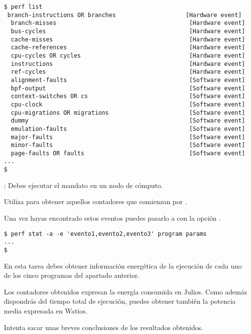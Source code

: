 \begin{lstlisting}[style=terminal]
$ perf list
 branch-instructions OR branches                    [Hardware event]
  branch-misses                                      [Hardware event]
  bus-cycles                                         [Hardware event]
  cache-misses                                       [Hardware event]
  cache-references                                   [Hardware event]
  cpu-cycles OR cycles                               [Hardware event]
  instructions                                       [Hardware event]
  ref-cycles                                         [Hardware event]
  alignment-faults                                   [Software event]
  bpf-output                                         [Software event]
  context-switches OR cs                             [Software event]
  cpu-clock                                          [Software event]
  cpu-migrations OR migrations                       [Software event]
  dummy                                              [Software event]
  emulation-faults                                   [Software event]
  major-faults                                       [Software event]
  minor-faults                                       [Software event]
  page-faults OR faults                              [Software event]
...
$
\end{lstlisting}

: Debes ejecutar el mandato en un nodo de cómputo.

Utiliza  para obtener aquellos contadores que comienzan 
por .

Una vez hayas encontrado estos eventos puedes pasarlo a 
con la opción .

\begin{lstlisting}[style=terminal]
$ perf stat -a -e 'evento1,evento2,evento3' program params
...
$
\end{lstlisting}

En esta tarea debes obtener información energética de la ejecución de cada uno de los
cinco programas del apartado anterior.

Los contadores obtenidos expresan la energía consumida en Julios. Como además
dispondrás del tiempo total de ejecución, puedes obtener también la potencia
media expresada en Watios.

Intenta sacar unas breves conclusiones de los resultados obtenidos.

